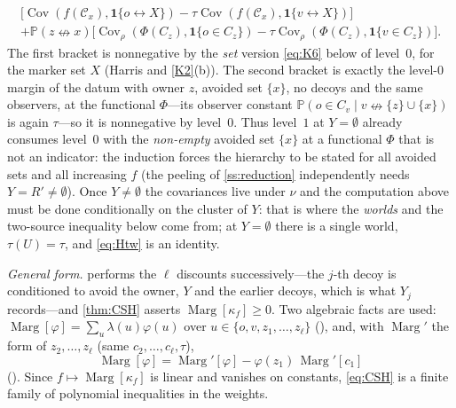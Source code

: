 \documentclass[11pt]{article}
\theoremstyle{definition}
\theoremstyle{remark}
\newcommand{\PP}{\mathbb{P}}
\DeclareMathOperator{\Cov}{Cov}
\newcommand{\con}{\leftrightarrow}
\newcommand{\ncon}{\nleftrightarrow}
\newcommand{\one}{\mathbf 1}
\newcommand{\eC}{\mathcal{C}}
\newcommand{\Marg}{\operatorname{Marg}}
\begin{document}
\begin{multline*}
 \bigl[\Cov(f(\eC_x),\one\{o\con X\})-\tau\Cov(f(\eC_x),\one\{v\con X\})\bigr]\\[-2pt]
 +\PP(z\ncon x)\bigl[\Cov_\rho(\Phi(C_z),\one\{o\in C_z\})-\tau\Cov_\rho(\Phi(C_z),\one\{v\in C_z\})\bigr].
\end{multline*}
The first bracket is nonnegative by the \emph{set} version \eqref{eq:K6} below of level~$0$, for the marker set $X$ (Harris and \ref{K2}(b)).
The second bracket is exactly the level-$0$ margin of the datum with owner $z$, avoided set $\{x\}$, no decoys and the same observers, at the
functional $\Phi$---its observer constant $\PP(o\in C_v\mid v\ncon\{z\}\cup\{x\})$ is again $\tau$---so it is nonnegative by level~$0$.  Thus
level~$1$ at $Y=\emptyset$ already consumes level~$0$ with the \emph{non-empty} avoided set $\{x\}$ at a functional $\Phi$ that is not an
indicator: the induction forces the hierarchy to be stated for all avoided sets and all increasing $f$ (the peeling of \cref{ss:reduction}
independently needs $Y=R'\neq\emptyset$).  Once $Y\neq\emptyset$ the covariances live under $\nu$ and the computation above must be done
conditionally on the cluster of $Y$: that is where the \emph{worlds} and the two-source inequality below come from; at $Y=\emptyset$ there is
a single world, $\tau(U)=\tau$, and \eqref{eq:Htw} is an identity.

\emph{General form.}   performs the $\ell$ discounts successively---the $j$-th decoy is conditioned to avoid the owner, $Y$ and the
earlier decoys, which is what $Y_j$ records---and \cref{thm:CSH} asserts $\Marg[\kappa_f]\ge0$.  Two algebraic facts are used:
$\Marg[\varphi]=\sum_u\lambda(u)\varphi(u)$ over $u\in\{o,v,z_1,\dots,z_\ell\}$ (), and, with $\Marg'$ the form of
$z_2,\dots,z_\ell$ (same $c_2,\dots,c_\ell,\tau$),
\begin{equation}\label{eq:cons}
 \Marg[\varphi]=\Marg'[\varphi]-\varphi(z_1)\,\Marg'[c_1]
\end{equation}
().  Since $f\mapsto\Marg[\kappa_f]$ is linear and vanishes on constants, \eqref{eq:CSH} is a finite family of polynomial inequalities in the weights.
\end{document}

